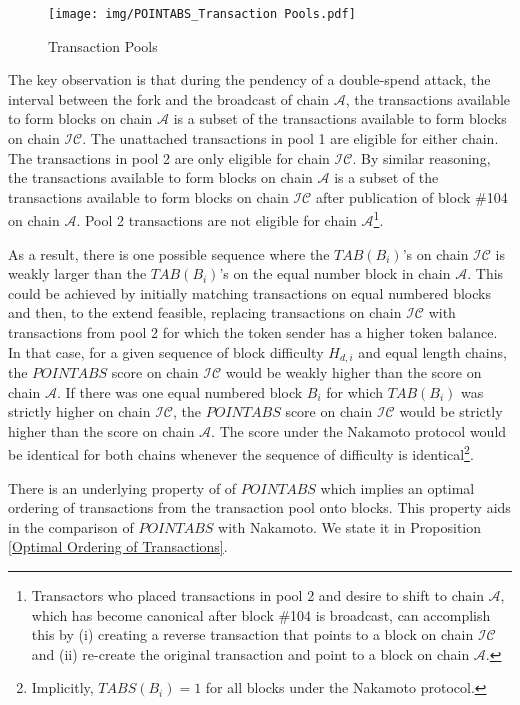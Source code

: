\documentclass[11pt]{article}
\theoremstyle{plain}
\begin{document}
\begin{figure}[H]
\begin{center}
\texttt{[image: img/POINTABS\_Transaction Pools.pdf]}
\end{center}
\caption{Transaction Pools}
\label{fig:Transaction Pools}
\end{figure}

The key observation is that during the pendency of a double-spend attack, the interval between the fork and the broadcast of chain $\mathcal{A}$, the transactions available to form blocks on chain $\mathcal{A}$ is a subset of the transactions available to form blocks on chain $\mathcal{IC}$. The unattached transactions in pool 1 are eligible for either chain. The transactions in pool 2 are only eligible for chain $\mathcal{IC}$. By similar reasoning, the transactions available to form blocks on chain $\mathcal{A}$ is a subset of the transactions available to form blocks on chain $\mathcal{IC}$ after publication of block \#104 on chain $\mathcal{A}$. Pool 2 transactions are not eligible for chain $\mathcal{A}$\footnote{Transactors who placed transactions in pool 2 and desire to shift to chain $\mathcal{A}$, which has become canonical after block \#104 is broadcast, can accomplish this by (i) creating a reverse transaction that points to a block on chain $\mathcal{IC}$ and (ii) re-create the original transaction and point to a block on chain $\mathcal{A}$.}. 

As a result, there is one possible sequence where the $TAB(B_{i})$'s on chain $\mathcal{IC}$ is weakly larger than the  $TAB(B_{i})$'s on the equal number block in chain $\mathcal{A}$. This could be achieved by initially matching transactions on equal numbered blocks and then, to the extend feasible, replacing transactions on chain $\mathcal{IC}$ with transactions from pool 2 for which the token sender has a higher token balance. In that case, for a given sequence of block difficulty $H_{d,i}$ and equal length chains, the $POINTABS$ score on chain $\mathcal{IC}$ would be weakly higher than the score on chain $\mathcal{A}$. If there was one equal numbered block $B_{i}$ for which $TAB(B_{i})$ was strictly higher on chain $\mathcal{IC}$, the $POINTABS$ score on chain $\mathcal{IC}$ would be strictly higher than the score on chain $\mathcal{A}$. The score under the Nakamoto protocol would be identical for both chains whenever the sequence of difficulty is identical\footnote{Implicitly, $TABS(B_{i}) = 1$ for all blocks under the Nakamoto protocol.}. 

There is an underlying property of of $POINTABS$ which implies an optimal ordering of transactions from the transaction pool onto blocks. This property aids in the comparison of $POINTABS$ with Nakamoto. We state it in Proposition \ref{Optimal Ordering of Transactions}.
\end{document}

